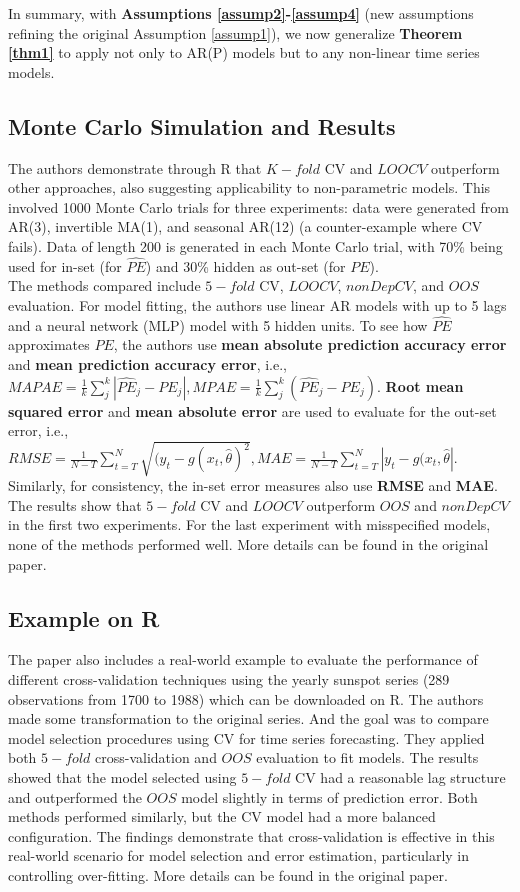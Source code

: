 \documentclass[12pt, oneside]{amsart}
\theoremstyle{definition}
\theoremstyle{remark}
\numberwithin{equation}{section}
\begin{document}
In summary, with \textbf{Assumptions \ref{assump2}-\ref{assump4}} (new assumptions refining the original Assumption \ref{assump1}), we now generalize \textbf{Theorem \ref{thm1}} to apply not only to AR(P) models but to any non-linear time series models.


\subsection{Monte Carlo Simulation and Results}
The authors demonstrate through R that $K-fold$ CV and $LOOCV$ outperform other approaches, also suggesting applicability to non-parametric models. This involved 1000 Monte Carlo trials for three experiments: data were generated from AR(3), invertible MA(1), and seasonal AR(12) (a counter-example where CV fails). Data of length 200 is generated in each Monte Carlo trial, with 70\% being used for in-set (for $\hat{PE}$) and 30\% hidden as out-set (for $PE$).\\

The methods compared include $5-fold$ CV, $LOOCV$, $nonDepCV$, and $OOS$ evaluation. For model fitting, the authors use linear AR models with up to 5 lags and a neural network (MLP) model with 5 hidden units.
To see how $\hat{PE}$ approximates $PE$, the authors use \textbf{mean absolute prediction accuracy error} and \textbf{mean prediction accuracy error}, i.e., $MAPAE = \frac{1}{k} \sum_j^k | \hat{PE}_j - PE_j|, MPAE = \frac{1}{k} \sum_j^k ( \hat{PE}_j - PE_j)$.
\textbf{Root mean squared error} and \textbf{mean absolute error} are used to evaluate for the out-set error, i.e., $RMSE = \frac{1}{N-T} \sum_{t=T}^N \sqrt{(y_t - g(x_t, \hat{\theta})^2}, MAE = \frac{1}{N-T} \sum_{t=T}^N |y_t - g(x_t, \hat{\theta}|$. Similarly, for consistency, the in-set error measures also use \textbf{RMSE} and \textbf{MAE}.\\

The results show that $5-fold$ CV and $LOOCV$ outperform $OOS$ and $nonDepCV$ in the first two experiments. For the last experiment with misspecified models, none of the methods performed well. More details can be found in the original paper.

\subsection{Example on R}
The paper also includes a real-world example to evaluate the performance of different cross-validation techniques using the yearly sunspot series (289 observations from 1700 to 1988) which can be downloaded on R. The authors made some transformation to the original series. And the goal was to compare model selection procedures using CV for time series forecasting. They applied both $5-fold$ cross-validation and $OOS$ evaluation to fit models. The results showed that the model selected using $5-fold$ CV had a reasonable lag structure and outperformed the $OOS$ model slightly in terms of prediction error. Both methods performed similarly, but the CV model had a more balanced configuration. The findings demonstrate that cross-validation is effective in this real-world scenario for model selection and error estimation, particularly in controlling over-fitting. More details can be found in the original paper.
\end{document}
